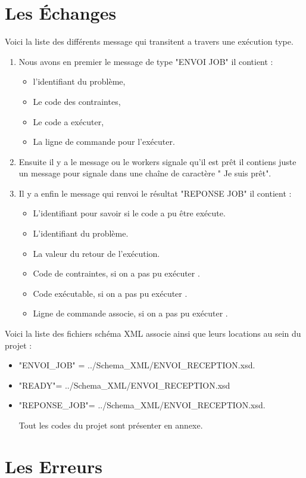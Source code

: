 \documentclass[11pt]{report}
\begin{document}
\chapter{Les Échanges} 
Voici la liste des différents message qui transitent a travers une exécution type.
\begin{enumerate} \item Nous avons en premier le message de type "ENVOI JOB" il contient :
\begin{itemize}
\item l'identifiant du problème,
\item Le code des contraintes,
\item Le code a exécuter,
\item La ligne de  commande pour l\textquoteright exécuter.
\end{itemize}
\item Ensuite il y a le message ou le workers signale qu'il est prêt il contiens juste un message pour signale dans une chaîne de caractère " Je suis prêt".
\item Il y a enfin le message qui renvoi le résultat "REPONSE JOB" il contient : 
\begin{itemize}
\item L'identifiant pour savoir si le code a pu être exécute.
\item L'identifiant du problème.
\item La valeur du retour de l\textquoteright exécution.
\item Code de contraintes, si on a pas pu exécuter .
\item Code exécutable, si on a pas pu exécuter .
\item Ligne de commande associe,  si on a pas pu exécuter .
\end{itemize}
\end{enumerate}
Voici la liste des fichiers schéma XML associe ainsi que leurs locations au sein du projet :
\begin{itemize}
\item "ENVOI\_JOB" = ../Schema\_XML/ENVOI\_RECEPTION.xsd.
\item "READY"= ../Schema\_XML/ENVOI\_RECEPTION.xsd 
\item "REPONSE\_JOB"= ../Schema\_XML/ENVOI\_RECEPTION.xsd.

Tout les codes du projet sont présenter en annexe.
\end{itemize}

\newpage
\chapter{Les Erreurs} 
\end{document}

